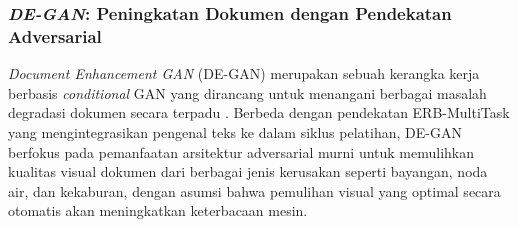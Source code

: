 \documentclass[12pt,a4paper]{article}
\begin{document}
\subsubsection{\textit{DE-GAN}: Peningkatan Dokumen dengan Pendekatan Adversarial}
\label{subsubsec:de-gan}

\textit{Document Enhancement GAN} (DE-GAN) merupakan sebuah kerangka kerja berbasis \textit{conditional} GAN yang dirancang untuk menangani berbagai masalah degradasi dokumen secara terpadu \parencite{souibgui2021degan}. Berbeda dengan pendekatan ERB-MultiTask yang mengintegrasikan pengenal teks ke dalam siklus pelatihan, DE-GAN berfokus pada pemanfaatan arsitektur adversarial murni untuk memulihkan kualitas visual dokumen dari berbagai jenis kerusakan seperti bayangan, noda air, dan kekaburan, dengan asumsi bahwa pemulihan visual yang optimal secara otomatis akan meningkatkan keterbacaan mesin.
\end{document}
